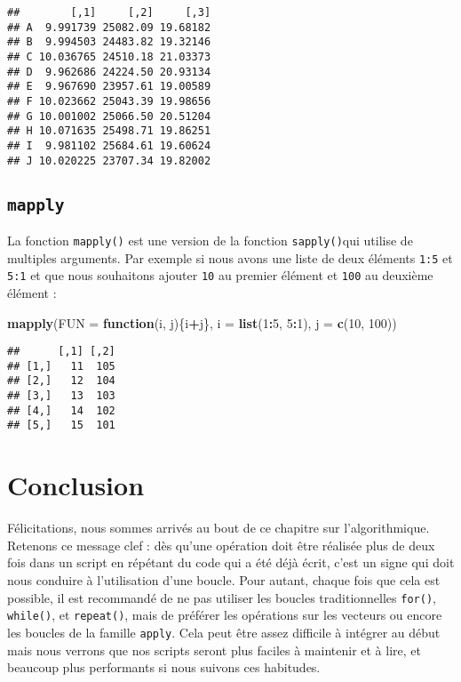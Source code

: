 \documentclass[]{book}
\newenvironment{Shaded}{\begin{snugshade}}{\end{snugshade}}
\newcommand{\KeywordTok}[1]{\textcolor[rgb]{0.13,0.29,0.53}{\textbf{#1}}}
\newcommand{\DataTypeTok}[1]{\textcolor[rgb]{0.13,0.29,0.53}{#1}}
\newcommand{\DecValTok}[1]{\textcolor[rgb]{0.00,0.00,0.81}{#1}}
\newcommand{\ControlFlowTok}[1]{\textcolor[rgb]{0.13,0.29,0.53}{\textbf{#1}}}
\newcommand{\OperatorTok}[1]{\textcolor[rgb]{0.81,0.36,0.00}{\textbf{#1}}}
\newcommand{\NormalTok}[1]{#1}
\theoremstyle{definition}
\theoremstyle{definition}
\theoremstyle{definition}
\theoremstyle{remark}
\begin{document}
\begin{verbatim}
##        [,1]     [,2]     [,3]
## A  9.991739 25082.09 19.68182
## B  9.994503 24483.82 19.32146
## C 10.036765 24510.18 21.03373
## D  9.962686 24224.50 20.93134
## E  9.967690 23957.61 19.00589
## F 10.023662 25043.39 19.98656
## G 10.001002 25066.50 20.51204
## H 10.071635 25498.71 19.86251
## I  9.981102 25684.61 19.60624
## J 10.020225 23707.34 19.82002
\end{verbatim}

\subsection{\texorpdfstring{\texttt{mapply}}{mapply}}\label{l17mapply}

La fonction \texttt{mapply()} est une version de la fonction
\texttt{sapply()}qui utilise de multiples arguments. Par exemple si nous
avons une liste de deux éléments \texttt{1:5} et \texttt{5:1} et que
nous souhaitons ajouter \texttt{10} au premier élément et \texttt{100}
au deuxième élément :

\begin{Shaded}
\begin{Highlighting}[]
\KeywordTok{mapply}\NormalTok{(}\DataTypeTok{FUN =} \ControlFlowTok{function}\NormalTok{(i, j)\{i}\OperatorTok{+}\NormalTok{j\}, }\DataTypeTok{i =} \KeywordTok{list}\NormalTok{(}\DecValTok{1}\OperatorTok{:}\DecValTok{5}\NormalTok{, }\DecValTok{5}\OperatorTok{:}\DecValTok{1}\NormalTok{), }\DataTypeTok{j =} \KeywordTok{c}\NormalTok{(}\DecValTok{10}\NormalTok{, }\DecValTok{100}\NormalTok{))}
\end{Highlighting}
\end{Shaded}

\begin{verbatim}
##      [,1] [,2]
## [1,]   11  105
## [2,]   12  104
## [3,]   13  103
## [4,]   14  102
## [5,]   15  101
\end{verbatim}

\section{Conclusion}\label{conclusion-6}

Félicitations, nous sommes arrivés au bout de ce chapitre sur
l'algorithmique. Retenons ce message clef : dès qu'une opération doit
être réalisée plus de deux fois dans un script en répétant du code qui a
été déjà écrit, c'est un signe qui doit nous conduire à l'utilisation
d'une boucle. Pour autant, chaque fois que cela est possible, il est
recommandé de ne pas utiliser les boucles traditionnelles
\texttt{for()}, \texttt{while()}, et \texttt{repeat()}, mais de préférer
les opérations sur les vecteurs ou encore les boucles de la famille
\texttt{apply}. Cela peut être assez difficile à intégrer au début mais
nous verrons que nos scripts seront plus faciles à maintenir et à lire,
et beaucoup plus performants si nous suivons ces habitudes.
\end{document}
